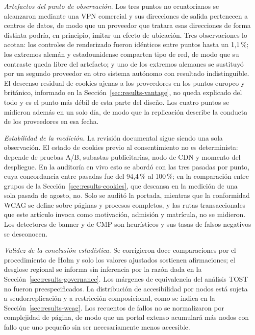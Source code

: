 \documentclass[pdflatex,sn-basic,Numbered]{sn-jnl}
\theoremstyle{thmstyleone}
\theoremstyle{thmstyletwo}
\theoremstyle{thmstylethree}
\begin{document}
\emph{Artefactos del punto de observaci\'on.} Los tres puntos no ecuatorianos se alcanzaron mediante una VPN comercial y sus direcciones de salida pertenecen a centros de datos, de modo que un proveedor que tratara esas direcciones de forma distinta podr\'ia, en principio, imitar un efecto de ubicaci\'on. Tres observaciones lo acotan: los controles de renderizado fueron id\'enticos entre puntos hasta un 1,1\,\%; los extremos alem\'an y estadounidense comparten tipo de red, de modo que su contraste queda libre del artefacto; y uno de los extremos alemanes se sustituy\'o por un segundo proveedor en otro sistema aut\'onomo con resultado indistinguible. El descenso residual de cookies ajenas a los proveedores en los puntos europeo y brit\'anico, informado en la Secci\'on~\ref{sec:results-vantage}, no queda explicado del todo y es el punto m\'as d\'ebil de esta parte del dise\~no. Los cuatro puntos se midieron adem\'as en un solo d\'ia, de modo que la replicaci\'on describe la conducta de los proveedores en esa fecha.

\emph{Estabilidad de la medici\'on.} La revisi\'on documental sigue siendo una sola observaci\'on. El estado de cookies previo al consentimiento no es determinista: depende de pruebas A/B, subastas publicitarias, nodo de CDN y momento del despliegue. En la auditor\'ia en vivo esto se abord\'o con las tres pasadas por punto, cuya concordancia entre pasadas fue del 94,4\,\% al 100\,\%; en la comparaci\'on entre grupos de la Secci\'on~\ref{sec:results-cookies}, que descansa en la medici\'on de una sola pasada de agosto, no. Solo se audit\'o la portada, mientras que la conformidad WCAG se define sobre p\'aginas y procesos completos, y las rutas transaccionales que este art\'iculo invoca como motivaci\'on, admisi\'on y matr\'icula, no se midieron. Los detectores de banner y de CMP son heur\'isticos y sus tasas de falsos negativos se desconocen.

\emph{Validez de la conclusi\'on estad\'istica.} Se corrigieron doce comparaciones por el procedimiento de Holm y solo los valores ajustados sostienen afirmaciones; el desglose regional se informa sin inferencia por la raz\'on dada en la Secci\'on~\ref{sec:results-governance}. Los m\'argenes de equivalencia del an\'alisis TOST no fueron preespecificados. La distribuci\'on de accesibilidad por nodos est\'a sujeta a seudorreplicaci\'on y a restricci\'on composicional, como se indica en la Secci\'on~\ref{sec:results-wcag}. Los recuentos de fallos no se normalizaron por complejidad de p\'agina, de modo que un portal extenso acumular\'a m\'as nodos con fallo que uno peque\~no sin ser necesariamente menos accesible.
\end{document}
